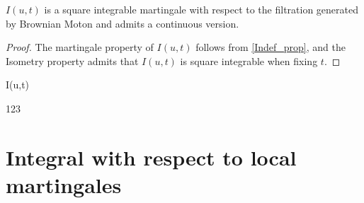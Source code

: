 \documentclass[12pt]{book}
\begin{document}
\begin{theorem}
	$I(u,t)$ is a square integrable martingale with respect to the filtration generated by Brownian Moton and admits a continuous version.
\end{theorem}

\begin{proof}
The martingale property of $I(u,t)$ follows from \ref{Indef_prop}, and the Isometry property admits that $I(u,t)$ is square integrable when fixing $t$.
\end{proof}



\begin{theorem}
	I(u,t) 
\end{theorem}

\begin{definition}
123	
\end{definition}

\section{Integral with respect to local martingales}
\end{document}
